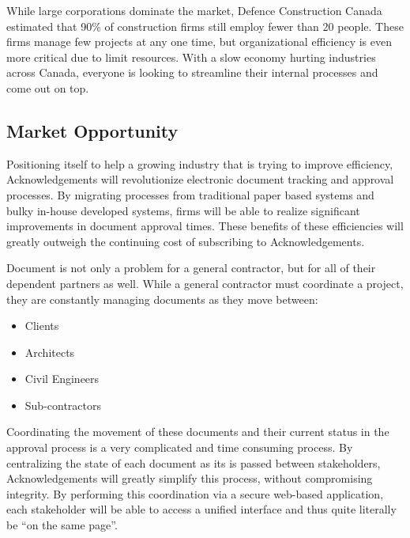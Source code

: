 While large corporations dominate the market, Defence Construction Canada estimated that 90\% of construction firms still employ fewer than 20 people. These firms manage few projects at any one time, but organizational efficiency is even more critical due to limit resources. With a slow economy hurting industries across Canada, everyone is looking to streamline their internal processes and come out on top.

\subsection{Market Opportunity}
Positioning itself to help a growing industry that is trying to improve efficiency, Acknowledgements will revolutionize electronic document tracking and approval processes. By migrating processes from traditional paper based systems and bulky in-house developed systems, firms will be able to realize significant improvements in document approval times. These benefits of these efficiencies will greatly outweigh the continuing cost of subscribing to Acknowledgements.

Document is not only a problem for a general contractor, but for all of their dependent partners as well. While a general contractor must coordinate a project, they are constantly managing documents as they move between:

\begin{itemize}
\item Clients
\item Architects
\item Civil Engineers
\item Sub-contractors
\end{itemize}

Coordinating the movement of these documents and their current status in the approval process is a very complicated and time consuming process. By centralizing the state of each document as its is passed between stakeholders, Acknowledgements will greatly simplify this process, without compromising integrity. By performing this coordination via a secure web-based application, each stakeholder will be able to access a unified interface and thus quite literally be ``on the same page''.